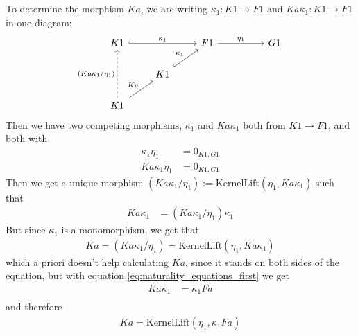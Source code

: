 \begin{example}
To determine the morphism $Ka$, we are writing $\kappa_{1} : K1 \rightarrow F1$ and $Ka \kappa_{1} : K1 \rightarrow F1$ in one diagram:
\[
\begin{tikzcd}
K1 \arrow[rr, "\kappa_{1}", hook]                                 &                                   & F1 \arrow[rr, "\eta_{1}"] &  & G1 \\
                                                                  & K1 \arrow[ru, "\kappa_{1}", hook] &                           &  &    \\
K1 \arrow[ru, "Ka"] \arrow[uu, "(Ka\kappa_{1}/\eta_{1})", dashed] &                                   &                           &  &   
\end{tikzcd}
\]
Then we have two competing morphisms, $\kappa_{1}$ and $Ka \kappa_{1}$ both from $K1 \rightarrow F1$, and both with
\begin{align*}
\kappa_{1}\eta_{1} &= 0_{K1,G1} \\
Ka \kappa_{1}\eta_{1} &= 0_{K1,G1}
\end{align*}
Then we get a unique morphism $(Ka\kappa_{1}/\eta_{1}) := \mathrm{KernelLift}(\eta_{1},Ka\kappa_{1})$ such that
\begin{align*}
Ka\kappa_{1} &= (Ka\kappa_{1}/\eta_{1})\kappa_{1}
\end{align*}
But since $\kappa_{1}$ is a monomorphism, we get that
\begin{align*}
Ka = (Ka\kappa_{1}/\eta_{1}) = \mathrm{KernelLift}(\eta_{1},Ka\kappa_{1})
\end{align*}
which a priori doesn't help calculating $Ka$, since it stands on both sides of the equation, but with equation
\eqref{eq:naturality_equations_first} we get
\begin{align*}
Ka\kappa_{1} &= \kappa_{1} Fa \\
\end{align*}
and therefore
\begin{align*}
Ka = \mathrm{KernelLift}(\eta_{1},\kappa_{1} Fa)
\end{align*}
\end{example}
